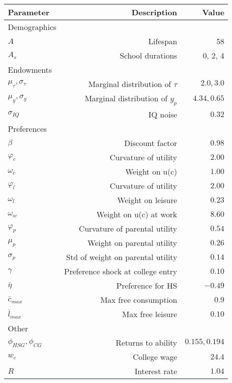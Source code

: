 \begin{tabular}{lrr}
\hline
Parameter & Description  & Value  \\ 
\hline
Demographics &   &   \\ 
$A$ & Lifespan  & 58  \\ 
$A_{s}$ & School durations  & 0, 2, 4  \\ 
Endowments &   &   \\ 
$\mu_{\tau}, \sigma_{\tau}$ & Marginal distribution of $\tau$  & $2.0, 3.0$  \\ 
$\mu_{y}, \sigma_{y}$ & Marginal distribution of $y_{p}$  & $4.34, 0.65$  \\ 
$\sigma_{IQ}$ & IQ noise  & $0.32$  \\ 
Preferences &   &   \\ 
$\beta$ & Discount factor  & $0.98$  \\ 
$\varphi_{c}$ & Curvature of utility  & $2.00$  \\ 
$\omega_{c}$ & Weight on u(c)  & $1.00$  \\ 
$\varphi_{l}$ & Curvature of utility  & $2.00$  \\ 
$\omega_{l}$ & Weight on leisure  & $0.23$  \\ 
$\omega_{w}$ & Weight on u(c) at work  & $8.60$  \\ 
$\varphi_{p}$ & Curvature of parental utility  & $0.54$  \\ 
$\mu_{p}$ & Weight on parental utility  & $0.26$  \\ 
$\sigma_{p}$ & Std of weight on parental utility  & $0.14$  \\ 
$\gamma$ & Preference shock at college entry  & $0.10$  \\ 
$\bar{\eta}$ & Preference for HS  & $-0.49$  \\ 
$\bar{c}_{max}$ & Max free consumption  & $0.9$  \\ 
$\bar{l}_{max}$ & Max free leisure  & $0.10$  \\ 
Other &   &   \\ 
$\phi_{HSG}, \phi_{CG}$ & Returns to ability  & $0.155, 0.194$  \\ 
$w_{c}$ & College wage  & $24.4$  \\ 
$R$ & Interest rate  & $1.04$  \\ 
\hline
\end{tabular}%
